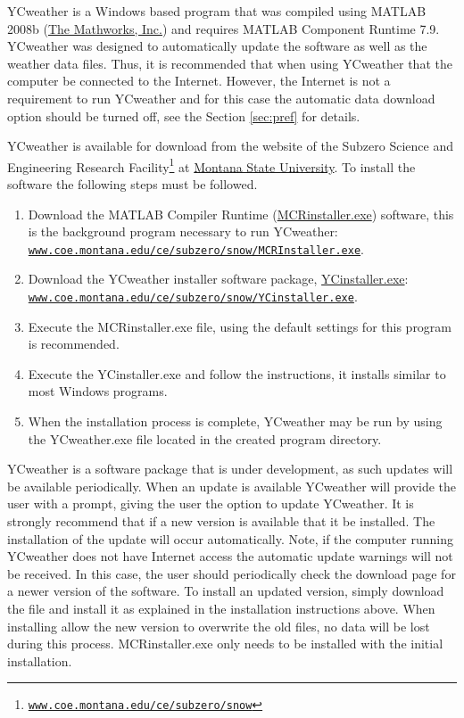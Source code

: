 \label{sec:install}
YCweather is a Windows based program that was compiled using MATLAB 2008b (\href{http://www.mathworks.com}{The Mathworks, Inc.}) and requires MATLAB Component Runtime 7.9.  YCweather was designed to automatically update the software as well as the weather data files.  Thus, it is recommended that when using YCweather that the computer be connected to the Internet.  However, the Internet is not a requirement to run YCweather and for this case the automatic data download option should be turned off, see the Section \ref{sec:pref} for details.

\label{sec:install}
YCweather is available for download from the website of the Subzero Science and Engineering Research Facility\footnote{\href{http://www.coe.montana.edu/ce/subzero/snow/}{\nolinkurl{www.coe.montana.edu/ce/subzero/snow}}} at \href{http://www.montana.edu}{Montana State University}.  To install the software the following steps must be followed.

\begin{enumerate}
\item Download the MATLAB Compiler Runtime (\href{http://www.coe.montana.edu/ce/subzero/snow/MCRInstaller.exe}{MCRinstaller.exe}) software, this is the background program necessary to run YCweather: \href{http://www.coe.montana.edu/ce/subzero/snow/MCRInstaller.exe}{\nolinkurl{www.coe.montana.edu/ce/subzero/snow/MCRInstaller.exe}}.
\item Download the YCweather installer software package, \href{http://www.coe.montana.edu/ce/subzero/snow/YCinstaller.exe}{YCinstaller.exe}: \href{http://www.coe.montana.edu/ce/subzero/snow/YCinstaller.exe}{\nolinkurl{www.coe.montana.edu/ce/subzero/snow/YCinstaller.exe}}.
\item Execute the MCRinstaller.exe file, using the default settings for this program is recommended.
\item Execute the YCinstaller.exe and follow the instructions, it installs similar to most Windows programs.
\item When the installation process is complete, YCweather may be run by using the YCweather.exe file located in the created program directory. 
\end{enumerate}


YCweather is a software package that is under development, as such updates will be available periodically.  When an update is available YCweather will provide the user with a prompt, giving the user the option to update YCweather.  It is strongly recommend that if a new version is available that it be installed.  The installation of the update will occur automatically.  Note, if the computer running YCweather does not have Internet access the automatic update warnings will not be received.  In this case, the user should periodically check the download page for a newer version of the software. To install an updated version, simply download the file and install it as explained in the installation instructions above.  When installing allow the new version to overwrite the old files, no data will be lost during this process.  MCRinstaller.exe only needs to be installed with the initial installation.

